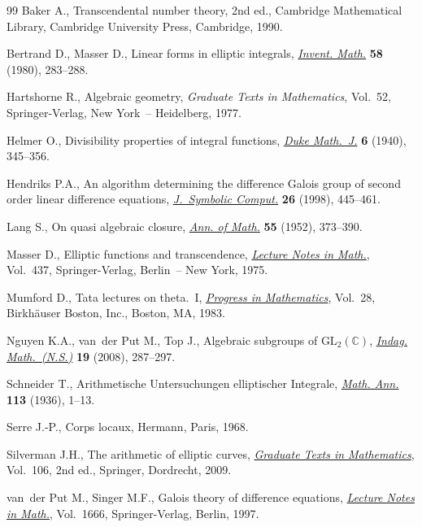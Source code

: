 \begin{thebibliography}{99}
Baker A., Transcendental number theory, 2nd ed., Cambridge Mathematical Library, Cambridge University Press, Cambridge,
1990.

Bertrand D., Masser D., Linear forms in elliptic integrals, \href{http://dx.doi.org/10.1007/BF01390255}{\textit{Invent. Math.}} \textbf{58} (1980), 283--288.

Hartshorne R., Algebraic geometry, \textit{Graduate Texts in Mathematics}, Vol.~52, Springer-Verlag, New York~--
Heidelberg, 1977.

Helmer O., Divisibility properties of integral functions,
\href{http://dx.doi.org/10.1215/S0012-7094-40-00626-3}{\textit{Duke Math.~J.}} \textbf{6} (1940), 345--356.

Hendriks P.A., An algorithm determining the dif\/ference {G}alois group of second order linear dif\/ference equations,
\href{http://dx.doi.org/10.1006/jsco.1998.0223}{\textit{J.~Symbolic Comput.}} \textbf{26} (1998), 445--461.

Lang S., On quasi algebraic closure, \href{http://dx.doi.org/10.2307/1969785}{\textit{Ann. of Math.}} \textbf{55} (1952), 373--390.

Masser D., Elliptic functions and transcendence, \href{http://dx.doi.org/10.1007/BFb0069432}{\textit{Lecture Notes in
Math.}}, Vol.~437, Springer-Verlag, Berlin~-- New York, 1975.

Mumford D., Tata lectures on theta.~{I}, \href{http://dx.doi.org/10.1007/978-1-4899-2843-6}{\textit{Progress in
Mathematics}}, Vol.~28, Birkh\"auser Boston, Inc., Boston, MA, 1983.

Nguyen K.A., van~der Put M., Top J., Algebraic subgroups of {${\text{GL}}_2({\mathbb{C}})$},
\href{http://dx.doi.org/10.1016/S0019-3577(08)80004-3}{\textit{Indag. Math.~(N.S.)}} \textbf{19} (2008), 287--297.

Schneider T., {A}rithmetische {U}ntersuchungen elliptischer {I}ntegrale,
\href{http://dx.doi.org/10.1007/BF01571618}{\textit{Math. Ann.}} \textbf{113} (1936), 1--13.

Serre J.-P., Corps locaux, Hermann, Paris, 1968.

Silverman J.H., The arithmetic of elliptic curves, \href{http://dx.doi.org/10.1007/978-0-387-09494-6}{\textit{Graduate Texts in Mathematics}}, Vol.~106, 2nd ed., Sprin\-ger, Dordrecht, 2009.

van~der Put M., Singer M.F., Galois theory of dif\/ference equations,
\href{http://dx.doi.org/10.1007/BFb0096118}{\textit{Lecture Notes in Math.}}, Vol.~1666, Springer-Verlag, Berlin, 1997.

\end{thebibliography}
